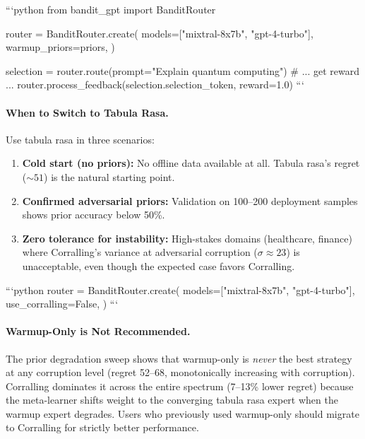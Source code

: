 ```python
from bandit_gpt import BanditRouter

router = BanditRouter.create(
    models=["mixtral-8x7b", "gpt-4-turbo"],
    warmup_priors=priors,
)

selection = router.route(prompt="Explain quantum computing")
# ... get reward ...
router.process_feedback(selection.selection_token, reward=1.0)
```

\paragraph{When to Switch to Tabula Rasa.}
Use tabula rasa in three scenarios:

\begin{enumerate}[nosep]
    \item \textbf{Cold start (no priors):}
    No offline data available at all.  Tabula rasa's regret (${\sim}51$)
    is the natural starting point.
    \item \textbf{Confirmed adversarial priors:}
    Validation on 100--200 deployment samples shows prior accuracy
    below 50\%.
    \item \textbf{Zero tolerance for instability:}
    High-stakes domains (healthcare, finance) where Corralling's
    variance at adversarial corruption ($\sigma{\approx}23$) is
    unacceptable, even though the expected case favors Corralling.
\end{enumerate}

```python
router = BanditRouter.create(
    models=["mixtral-8x7b", "gpt-4-turbo"],
    use_corralling=False,
)
```

\paragraph{Warmup-Only is Not Recommended.}
The prior degradation sweep shows that warmup-only is \emph{never} the
best strategy at any corruption level (regret 52--68, monotonically
increasing with corruption).  Corralling dominates it across the entire
spectrum (7--13\% lower regret) because the meta-learner shifts weight
to the converging tabula rasa expert when the warmup expert degrades.
Users who previously used warmup-only should migrate to Corralling for
strictly better performance.

